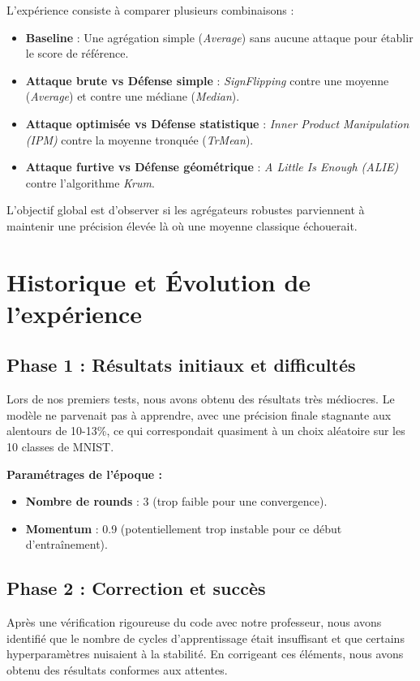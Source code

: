 \documentclass[11pt, a4paper]{article}
\begin{document}
L'expérience consiste à comparer plusieurs combinaisons :
\begin{itemize}
    \item \textbf{Baseline} : Une agrégation simple (\textit{Average}) sans aucune attaque pour établir le score de référence.
    \item \textbf{Attaque brute vs Défense simple} : \textit{SignFlipping} contre une moyenne (\textit{Average}) et contre une médiane (\textit{Median}).
    \item \textbf{Attaque optimisée vs Défense statistique} : \textit{Inner Product Manipulation (IPM)} contre la moyenne tronquée (\textit{TrMean}).
    \item \textbf{Attaque furtive vs Défense géométrique} : \textit{A Little Is Enough (ALIE)} contre l'algorithme \textit{Krum}.
\end{itemize}

L'objectif global est d'observer si les agrégateurs robustes parviennent à maintenir une précision élevée là où une moyenne classique échouerait.

\section{Historique et Évolution de l'expérience}

\subsection{Phase 1 : Résultats initiaux et difficultés}
Lors de nos premiers tests, nous avons obtenu des résultats très médiocres. Le modèle ne parvenait pas à apprendre, avec une précision finale stagnante aux alentours de 10-13\%, ce qui correspondait quasiment à un choix aléatoire sur les 10 classes de MNIST.

\textbf{Paramétrages de l'époque :}
\begin{itemize}
    \item \textbf{Nombre de rounds} : 3 (trop faible pour une convergence).
    \item \textbf{Momentum} : 0.9 (potentiellement trop instable pour ce début d'entraînement).
\end{itemize}

\subsection{Phase 2 : Correction et succès}
Après une vérification rigoureuse du code avec notre professeur, nous avons identifié que le nombre de cycles d'apprentissage était insuffisant et que certains hyperparamètres nuisaient à la stabilité. En corrigeant ces éléments, nous avons obtenu des résultats conformes aux attentes.
\end{document}
